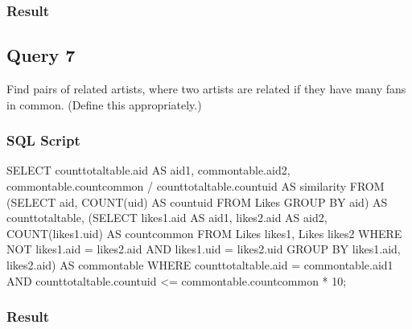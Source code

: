 \documentclass[letterpaper, 12pt]{report}
\begin{document}
	\subsubsection{Result}
	
	\subsection{Query 7}
	Find pairs of related artists, where two artists are related if they have many fans in common. (Define
	this appropriately.)
	\subsubsection{SQL Script}
	\begin{spverbatim}
		SELECT counttotaltable.aid AS aid1, commontable.aid2,
		commontable.countcommon / counttotaltable.countuid AS similarity
		FROM (SELECT aid, COUNT(uid) AS countuid FROM Likes GROUP BY aid) AS counttotaltable,
		(SELECT likes1.aid AS aid1, likes2.aid AS aid2, COUNT(likes1.uid) AS countcommon
		FROM Likes likes1, Likes likes2
		WHERE NOT likes1.aid = likes2.aid
		AND likes1.uid = likes2.uid
		GROUP BY likes1.aid, likes2.aid) AS commontable
		WHERE counttotaltable.aid = commontable.aid1
		AND counttotaltable.countuid <= commontable.countcommon * 10;
	\end{spverbatim}
	
	
	\subsubsection{Result}
	
	
\end{document}
